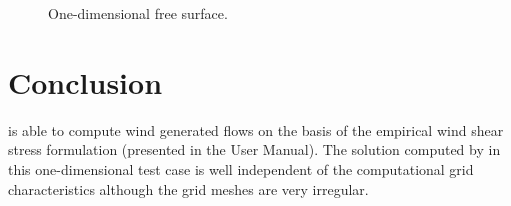 \begin{figure}[H]
 \centering
 \caption{One-dimensional free surface.}
 \label{t2d:wind:fig:freeS1d}
\end{figure}

\section{Conclusion}
 is able to compute wind generated flows on the basis of the
empirical wind shear stress formulation  (presented in the  User Manual). 
The solution computed by  in this one-dimensional test case is well
independent of the computational grid characteristics although the grid meshes
are very irregular.
